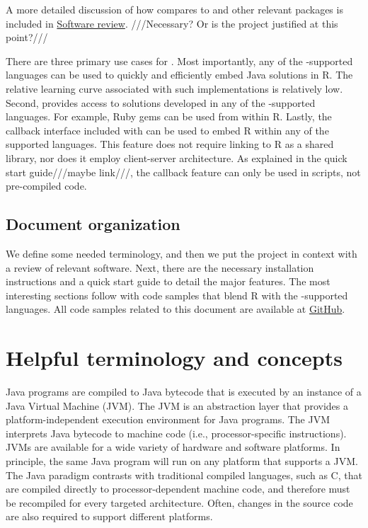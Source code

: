 A more detailed discussion of how  compares to  and other relevant packages is included in \hyperlink{softwarereview}{Software review}. ///Necessary? Or is the project justified at this point?///

There are three primary use cases for . Most importantly, any of the -supported languages can be used to quickly and efficiently embed Java solutions in R. The relative learning curve associated with such implementations is relatively low. Second,  provides access to solutions developed in any of the -supported languages. For example, Ruby gems can be used from within R. Lastly, the callback interface included with  can be used to embed R within any of the supported languages. This feature does not require linking to R as a shared library, nor does it employ client-server architecture. As explained in the quick start guide///maybe link///, the callback feature can only be used in scripts, not pre-compiled code.

\subsection{Document organization}

We define some needed terminology, and then we put the  project in context with a review of relevant software. Next, there are the necessary installation instructions and a quick start guide to detail the major features. The most interesting sections follow with code samples that blend R with the -supported languages. All code samples related to this document are available at \href{http://notavalidaddresss////}{GitHub}.

\section{Helpful terminology and concepts}

Java programs are compiled to Java bytecode that is executed by an instance of a Java Virtual Machine (JVM). The JVM is an abstraction layer that provides a platform-independent execution environment for Java programs. The JVM interprets Java bytecode to machine code (i.e., processor-specific instructions). JVMs are available for a wide variety of hardware and software platforms. In principle, the same Java program will run on any platform that supports a JVM. The Java paradigm contrasts with traditional compiled languages, such as C, that are compiled directly to processor-dependent machine code, and therefore must be recompiled for every targeted architecture. Often, changes in the source code are also required to support different platforms.

